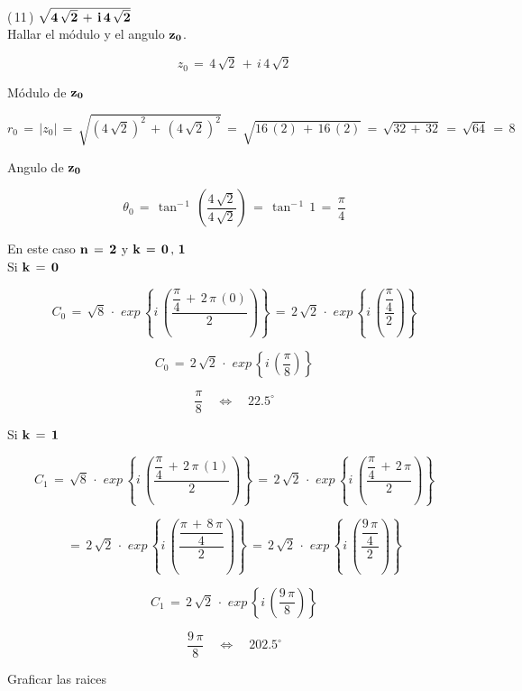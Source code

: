 \documentclass[a4paper,11pt,openany]{book}
\begin{document}
\textcolor{ao(english)}{(\,11\,)} $\bf{\sqrt{4\,\sqrt{2}\,+\,i\,4\,\sqrt{2}}}$\\

\textcolor{ao(english)}{} Hallar el módulo y el angulo $\bf{z_{0}}$.

$$z_{0}\,=\,4\,\sqrt{2}\,+\,i\,4\,\sqrt{2}$$

\textcolor{ao(english)}{} Módulo de $\bf{z_{0}}$

$$r_{0}\,=\,|z_{0}|\,=\,\sqrt{\left(4\,\sqrt{2}\right)^{2}\,+\,\left(4\,\sqrt{2}\right)^{2}}\,=\,\sqrt{16\,(2)\,+\,16\,(2)}\,=\,\sqrt{32\,+\,32}\,=\,\sqrt{64}\,=\,8$$

\textcolor{ao(english)}{} Angulo de $\bf{z_{0}}$

$$\theta_{0}\,=\,\tan^{-\,1}\,\left(\dfrac{4\,\sqrt{2}}{4\,\sqrt{2}}\right)\,=\,\tan^{-\,1}\,1\,=\,\dfrac{\pi}{4}$$

\textcolor{ao(english)}{} En este caso $\bf{n\,=\,2}$ y $\bf{k\,=\,0\,,\,1}$\\

\textcolor{ao(english)}{} Si $\bf{k\,=\,0}$

$$C_{0}\,=\,\sqrt{8}\,\cdot\,\,exp\,\left\{i\,\left(\dfrac{\dfrac{\pi}{4}\,+\,2\,\pi\,(0)}{2}\right)\right\}\,=\,2\,\sqrt{2}\,\cdot\,\,exp\,\left\{i\,\left(\dfrac{\dfrac{\pi}{4}}{2}\right)\right\}$$

$$C_{0}\,=\,2\,\sqrt{2}\,\cdot\,\,exp\,\left\{i\,\left(\dfrac{\pi}{8}\right)\right\}$$

$$\dfrac{\pi}{8} \quad\iff\quad 22.5^\circ$$

\textcolor{ao(english)}{} Si $\bf{k\,=\,1}$

$$C_{1}\,=\,\sqrt{8}\,\cdot\,\,exp\,\left\{i\,\left(\dfrac{\dfrac{\pi}{4}\,+\,2\,\pi\,(1)}{2}\right)\right\}\,=\,2\,\sqrt{2}\,\cdot\,\,exp\,\left\{i\,\left(\dfrac{\dfrac{\pi}{4}\,+\,2\,\pi}{2}\right)\right\}$$

$$=\,2\,\sqrt{2}\,\cdot\,\,exp\,\left\{i\,\left(\dfrac{\dfrac{\pi\,+\,8\,\pi}{4}}{2}\right)\right\}\,=\,2\,\sqrt{2}\,\cdot\,\,exp\,\left\{i\,\left(\dfrac{\dfrac{9\,\pi}{4}}{2}\right)\right\}$$

$$C_{1}\,=\,2\,\sqrt{2}\,\cdot\,\,exp\,\left\{i\,\left(\dfrac{9\,\pi}{8}\right)\right\}$$

$$\dfrac{9\,\pi}{8} \quad\iff\quad 202.5^\circ$$

\textcolor{ao(english)}{} Graficar las raices
\end{document}
